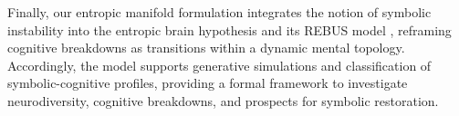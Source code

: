 Finally, our entropic manifold formulation integrates the notion of symbolic instability into the entropic brain hypothesis \cite{carhart2014entropic} and its REBUS model \cite{carhart2019rebus}, reframing cognitive breakdowns as transitions within a dynamic mental topology. Accordingly, the model supports generative simulations and classification of symbolic-cognitive profiles, providing a formal framework to investigate neurodiversity, cognitive breakdowns, and prospects for symbolic restoration.